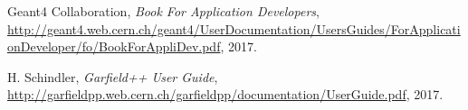 \documentclass[preprint,12pt,sort&compress]{elsarticle}
\begin{document}
\newpage

\begin{thebibliography}{9}

Geant4 Collaboration, \textit{Book For Application Developers}, \url{http://geant4.web.cern.ch/geant4/UserDocumentation/UsersGuides/ForApplicationDeveloper/fo/BookForAppliDev.pdf}, 2017.

H. Schindler, \textit{Garfield++ User Guide}, \url{http://garfieldpp.web.cern.ch/garfieldpp/documentation/UserGuide.pdf}, 2017.

\end{thebibliography}
\end{document}
